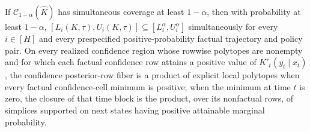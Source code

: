 If \(\mathcal C_{1-\alpha}(\widehat K)\) has simultaneous coverage at least \(1-\alpha\), then with probability at least \(1-\alpha\), \([L_i(K,\tau),U_i(K,\tau)]\subseteq[L_i^{\alpha},U_i^{\alpha}]\) simultaneously for every \(i\in[H]\) and every prespecified positive-probability factual trajectory and policy pair. On every realized confidence region whose rowwise polytopes are nonempty and for which each factual confidence row attains a positive value of \(K'_t(y_t\mid x_t)\), the confidence posterior-row fiber is a product of explicit local polytopes when every factual confidence-cell minimum is positive; when the minimum at time \(t\) is zero, the closure of that time block is the product, over its nonfactual rows, of simplices supported on next states having positive attainable marginal probability.
